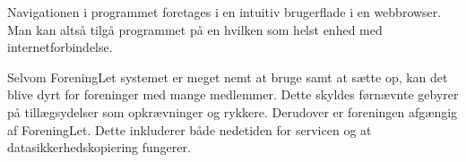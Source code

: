 Navigationen i programmet foretages i en intuitiv brugerflade i en webbrowser. Man kan altså tilgå programmet på en hvilken som helst enhed med internetforbindelse. 


Selvom ForeningLet systemet er meget nemt at bruge samt at sætte op, kan det blive dyrt for foreninger med mange medlemmer. Dette skyldes førnævnte gebyrer på tillægsydelser som opkrævninger og rykkere. Derudover er foreningen afgængig af ForeningLet. Dette inkluderer både nedetiden for servicen og at datasikkerhedskopiering fungerer.

